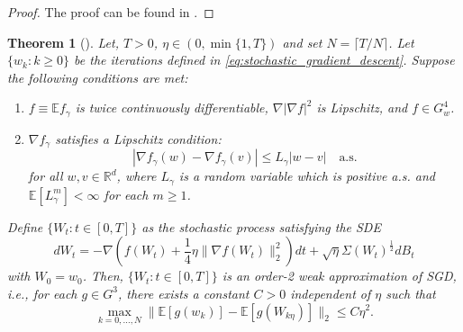 \documentclass[12pt]{article}
\newtheorem{theorem}{Theorem}[section]
\theoremstyle{definition}
\numberwithin{equation}{section}
\newcommand{\R}{\mathbb{R}}
\newcommand{\E}{\mathbb{E}}
\newcommand{\ev}[1]{\mathbb{E}\left[{#1}\right]}
\newcommand{\norm}[1]{\lVert{#1}\rVert_2}
\begin{document}
\begin{proof}
  The proof can be found in \cite[Lemma 29]{liStochasticModifiedEquations2019}.
\end{proof}
\begin{theorem}[\autocite{liStochasticModifiedEquations2019}]
  \label{thm:second_order}
  Let, $T > 0$, $\eta \in (0, \min\{1,T\})$ and set $N = \lceil T/N \rceil$. Let $\{w_k:k\geq 0\}$ be the iterations defined in \eqref{eq:stochastic_gradient_descent}. Suppose the following conditions are met:
  \begin{enumerate}[label=(\roman*)]
    \item $f \equiv \E f_{\gamma}$ is twice continuously differentiable, $\nabla |\nabla f |^2$ is Lipschitz, and $f \in G^4_w$.
    \item $\nabla f_{\gamma}$ satisfies a Lipschitz condition:
    \begin{equation*}
      |\nabla f_{\gamma}(w) - \nabla f_{\gamma}(v)| \leq L_{\gamma} |w - v| \quad \text{a.s.}
    \end{equation*}
    for all $w,v \in \R^d$, where $L_{\gamma}$ is a random variable which is positive a.s. and $\ev{L_{\gamma}^m} < \infty$ for each $m \geq 1$.
  \end{enumerate}
  Define $\{W_t:t\in [0,T] \}$ as the stochastic process satisfying the SDE
  \begin{equation}
    \label{eq:second_order_sde}
    d W_t = -\nabla\left(f(W_t) + \frac{1}{4}\eta \norm{\nabla f(W_t)}^2\right)dt + \sqrt{\eta}\Sigma(W_t)^{\frac{1}{2}}dB_t
  \end{equation}
  with $W_0 = w_0$. Then, $\{W_t:t\in [0,T] \}$ is an order-2 weak approximation of SGD, i.e., for each $g \in G^3$, there exists a constant $C > 0$ independent of $\eta$ such that
  \begin{equation}
    \label{eq:second_order_convergence}
    \max_{k=0,\dots,N} \norm{\ev{g(w_k)} - \ev{g(W_{k\eta})}} \leq C \eta^2.
  \end{equation}
\end{theorem}
\end{document}
